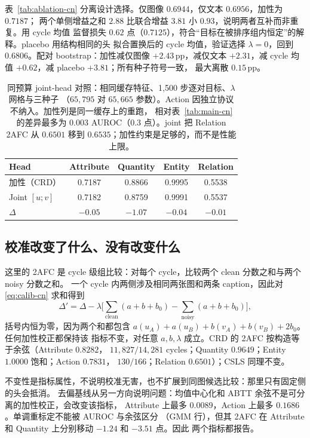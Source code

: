 \documentclass[10pt,twocolumn,a4paper]{ctexart}
\begin{document}
表~\ref{tab:ablation-cn} 分离设计选择。仅图像 $0.6944$，仅文本 $0.6956$，加性为 $0.7187$；
两个单侧增益之和 $2.88$ 比联合增益 $3.81$ 小 $0.93$，说明两者互补而非重复。用 cycle 均值
监督损失 $0.62$ 点（$0.7125$），符合“目标在被排序组内恒定”的解释。placebo 用结构相同的头
拟合置换后的 cycle 均值，验证选择 $\lambda=0$，回到 $0.6806$。配对 bootstrap：加性减仅图像
$+2.43$\,pp，减仅文本 $+2.31$，减 cycle 均值 $+0.62$，减 placebo $+3.81$；所有种子符号一致，
最大离散 $0.15$\,pp。

\begin{table}[t]
\centering
\footnotesize
\setlength{\tabcolsep}{4pt}
\caption{同预算 joint-head 对照：相同缓存特征、1,500 步逐对目标、$\lambda$ 网格与三种子
（$65{,}795$ 对 $65{,}665$ 参数）。Action 因独立协议不纳入。加性列是同一缓存上的重跑，
相对表~\ref{tab:main-cn} 的差异最多为 $0.003$ AUROC（$0.3$ 点）。joint 把 Relation 2AFC 从
$0.6501$ 移到 $0.6535$；加性约束是足够的，而不是性能上限。}
\label{tab:joint-cn}
\begin{tabular}{lcccc}
\toprule
Head & Attribute & Quantity & Entity & Relation \\
\midrule
加性（CRD） & 0.7187 & 0.8866 & 0.9995 & 0.5538 \\
Joint $[u;v]$ & 0.7182 & 0.8759 & 0.9991 & 0.5537 \\
$\Delta$ & $-0.05$ & $-1.07$ & $-0.04$ & $-0.01$ \\
\bottomrule
\end{tabular}
\end{table}

\subsection{校准改变了什么、没有改变什么}
这里的 2AFC 是 cycle 级组比较：对每个 cycle，比较两个 clean 分数之和与两个 noisy 分数之和。
一个 cycle 内两侧涉及相同两张图和两条 caption，因此对 \eqref{eq:calib-cn} 求和得到
\begin{equation}
  \Delta'=\Delta-\lambda\Big[\sum_{\text{clean}}(a+b+b_0)
  -\sum_{\text{noisy}}(a+b+b_0)\Big],
\end{equation}
括号内恒为零，因为两个和都包含 $a(u_A)+a(u_B)+b(v_A)+b(v_B)+2b_0$。任何加性校正都保持该
指标不变，对任意 $a,b,\lambda$ 成立。CRD 的 2AFC 按构造等于余弦（Attribute $0.8282$，
$11{,}827/14{,}281$ cycles；Quantity $0.9649$；Entity $1.0000$ 饱和；Action $0.7831$，
$130/166$；Relation $0.6501$）；CSLS 同理不变。

不变性是指标属性，不说明校准无害，也不扩展到同图候选比较：那里只有固定侧的头会抵消。
去偏基线从另一方向说明问题：均值中心化和 ABTT 余弦不是可分离的加性校正，会改变该指标，
Attribute 上最多 $0.0089$，Action 上最多 $0.1686$。单调重标定不能被 AUROC 与余弦区分
（GMM 行），但其 2AFC 在 Attribute 和 Quantity 上分别移动 $-1.24$ 和 $-3.51$ 点。因此
两个指标都报告。
\end{document}
